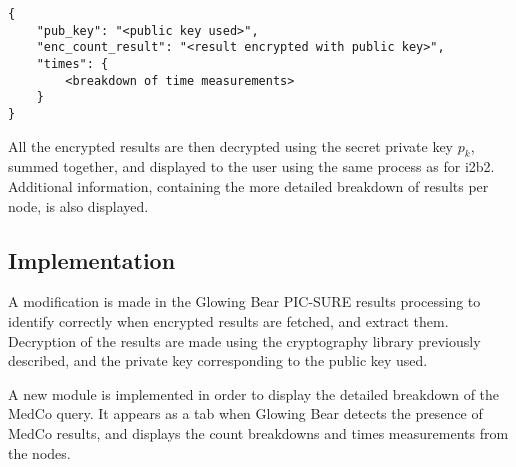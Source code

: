 \begin{verbatim}
{
    "pub_key": "<public key used>",
    "enc_count_result": "<result encrypted with public key>",
    "times": {
        <breakdown of time measurements>
    }
}    
\end{verbatim}

All the encrypted results are then decrypted using the secret private key $p_k$, summed together, and displayed to the user using the same process as for i2b2.
Additional information, containing the more detailed breakdown of results per node, is also displayed.


\subsection*{Implementation}

A modification is made in the Glowing Bear PIC-SURE results processing to identify correctly when encrypted results are fetched, and extract them.
Decryption of the results are made using the cryptography library previously described, and the private key corresponding to the public key used.

A new module is implemented in order to display the detailed breakdown of the MedCo query.
It appears as a tab when Glowing Bear detects the presence of MedCo results, and displays the count breakdowns and times measurements from the nodes.
